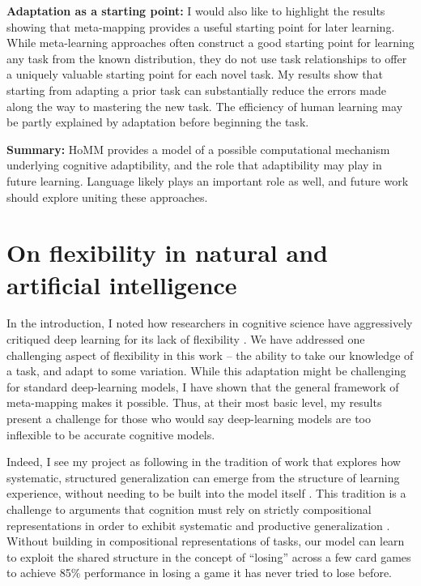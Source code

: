 \textbf{Adaptation as a starting point:} I would also like to highlight the results showing that meta-mapping provides a useful starting point for later learning. While meta-learning approaches often construct a good starting point for learning any task from the known distribution, they do not use task relationships to offer a uniquely valuable starting point for each novel task. My results show that starting from adapting a prior task can substantially reduce the errors made along the way to mastering the new task. The efficiency of human learning may be partly explained by adaptation before beginning the task. \par 

\textbf{Summary:} HoMM provides a model of a possible computational mechanism underlying cognitive adaptibility, and the role that adaptibility may play in future learning. Language likely plays an important role as well, and future work should explore uniting these approaches. 

\section{On flexibility in natural and artificial intelligence}

In the introduction, I noted how researchers in cognitive science have aggressively critiqued deep learning for its lack of flexibility \citep[e.g.][]{Lake2015, Lake2016, Lake2017, Marcus2018}. We have addressed one challenging aspect of flexibility in this work -- the ability to take our knowledge of a task, and adapt to some variation. While this adaptation might be challenging for standard deep-learning models, I have shown that the general framework of meta-mapping makes it possible. Thus, at their most basic level, my results present a challenge for those who would say deep-learning models are too inflexible to be accurate cognitive models. \par  

Indeed, I see my project as following in the tradition of work that explores how systematic, structured generalization can emerge from the structure of learning experience, without needing to be built into the model itself \citep{McClelland2010a, McClelland2010, Hansen2017}. This tradition is a challenge to arguments that cognition must rely on strictly compositional representations in order to exhibit systematic and productive generalization \citep[e.g.][]{Fodor2001, Fodor2008lot2, Lake2017}. Without building in compositional representations of tasks, our model can learn to exploit the shared structure in the concept of ``losing'' across a few card games to achieve 85\% performance in losing a game it has never tried to lose before. \par 

